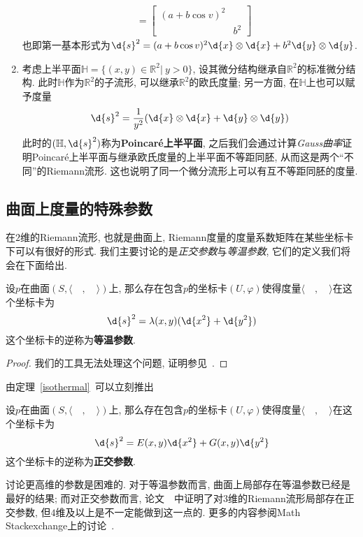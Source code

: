 \begin{eg}
\begin{enumerate}[(1)]
\begin{align*}
            &=\begin{bmatrix}
                (a+b\cos{v})^2 & \\ & b^2
            \end{bmatrix}
        \end{align*}
        也即第一基本形式为$\d{s}^2=(a+b\cos{v})^2\d{x}\otimes\d{x}+b^2\d{y}\otimes\d{y}$.
        \item 考虑上半平面$\mathbb{H}=\{(x,y)\in\mathbb{R}^2|\ y>0\}$, 设其微分结构继承自$\mathbb{R}^2$的标准微分结构.
        此时$\mathbb{H}$作为$\mathbb{R}^2$的子流形, 可以继承$\mathbb{R}^2$的欧氏度量;
        另一方面, 在$\mathbb{H}$上也可以赋予度量
        \[\d{s}^2=\frac{1}{y^2}(\d{x}\otimes\d{x}+\d{y}\otimes\d{y})\]
        此时的$(\mathbb{H},\d{s}^2)$称为\textbf{Poincar\'{e}上半平面}, 之后我们会通过计算\textit{Gauss曲率}证明Poincar\'{e}上半平面与继承欧氏度量的上半平面不等距同胚, 从而这是两个``不同''的Riemann流形.
        这也说明了同一个微分流形上可以有互不等距同胚的度量.
    \end{enumerate}
\end{eg}

\subsection*{曲面上度量的特殊参数}
在$2$维的Riemann流形, 也就是曲面上, Riemann度量的度量系数矩阵在某些坐标卡下可以有很好的形式.
我们主要讨论的是\textit{正交参数}与\textit{等温参数}, 它们的定义我们将会在下面给出.

\begin{thm}[等温参数]\label{isothermal}
    设$p$在曲面$(S,\langle\quad,\quad\rangle)$上, 那么存在包含$p$的坐标卡$(U,\varphi)$使得度量$\langle\quad,\quad\rangle$在这个坐标卡为
    \[\d{s}^2=\lambda(x,y)(\d{x^2}+\d{y^2})\]
    这个坐标卡的逆称为\textbf{等温参数}.
\end{thm}
\begin{proof}
    我们的工具无法处理这个问题, 证明参见~\parencite{Chern_isothermal}.
\end{proof}

由定理~\ref{isothermal}~可以立刻推出

\begin{col}[正交参数]\label{orthothm}
    设$p$在曲面$(S,\langle\quad,\quad\rangle)$上, 那么存在包含$p$的坐标卡$(U,\varphi)$使得度量$\langle\quad,\quad\rangle$在这个坐标卡为
    \[\d{s}^2=E(x,y)\d{x^2}+G(x,y)\d{y^2}\]
    这个坐标卡的逆称为\textbf{正交参数}.
\end{col}

讨论更高维的参数是困难的.
对于等温参数而言, 曲面上局部存在等温参数已经是最好的结果;
而对正交参数而言, 论文~\parencite{DeTurkYang_orthogonal}~中证明了对$3$维的Riemann流形局部存在正交参数, 但$4$维及以上是不一定能做到这一点的.
更多的内容参阅Math Stackexchange上的讨论~\parencite{Kohan_Parameter}.
